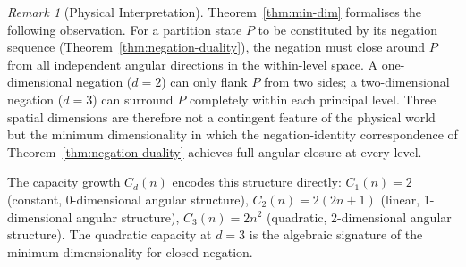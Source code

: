 \documentclass[twocolumn,10pt,a4paper]{article}
\theoremstyle{thmstyle}
\theoremstyle{definition}
\theoremstyle{remark}
\newtheorem{remark}[theorem]{Remark}
\begin{document}
\begin{remark}[Physical Interpretation]
Theorem~\ref{thm:min-dim} formalises the following observation. For a partition state $P$ to be constituted by its negation sequence (Theorem~\ref{thm:negation-duality}), the negation must close around $P$ from all independent angular directions in the within-level space. A one-dimensional negation ($d=2$) can only flank $P$ from two sides; a two-dimensional negation ($d=3$) can surround $P$ completely within each principal level. Three spatial dimensions are therefore not a contingent feature of the physical world but the minimum dimensionality in which the negation-identity correspondence of Theorem~\ref{thm:negation-duality} achieves full angular closure at every level.

The capacity growth $C_d(n)$ encodes this structure directly: $C_1(n) = 2$ (constant, 0-dimensional angular structure), $C_2(n) = 2(2n+1)$ (linear, 1-dimensional angular structure), $C_3(n) = 2n^2$ (quadratic, 2-dimensional angular structure). The quadratic capacity at $d = 3$ is the algebraic signature of the minimum dimensionality for closed negation.
\end{remark}
\end{document}
